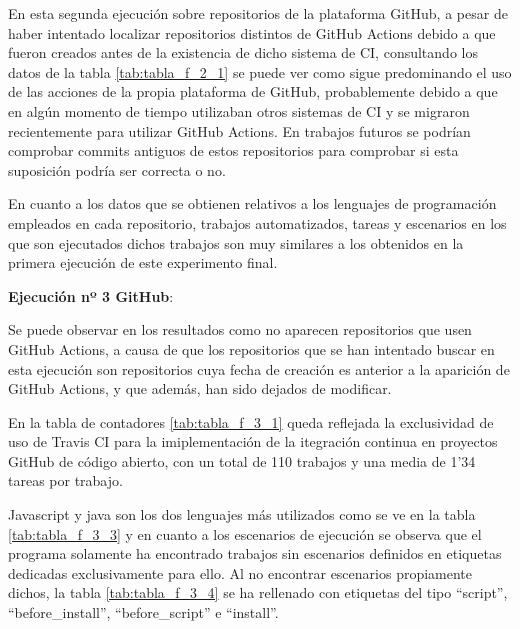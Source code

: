 \begin{compactitem}
    En esta segunda ejecución sobre repositorios de la plataforma GitHub, a pesar de haber intentado localizar repositorios distintos de GitHub Actions debido a que fueron creados antes de la existencia de dicho sistema de CI, consultando los datos de la tabla \ref{tab:tabla_f_2_1} se puede ver como sigue predominando el uso de las acciones de la propia plataforma de GitHub, probablemente debido a que en algún momento de tiempo utilizaban otros sistemas de CI y se migraron recientemente para utilizar GitHub Actions. En trabajos futuros se podrían comprobar commits antiguos de estos repositorios para comprobar si esta suposición podría ser correcta o no.
    
    En cuanto a los datos que se obtienen relativos a los lenguajes de programación empleados en cada repositorio, trabajos automatizados, tareas y escenarios en los que son ejecutados dichos trabajos son muy similares a los obtenidos en la primera ejecución de este experimento final.
    
    \item \textbf{Ejecución nº 3 GitHub}:
    
    Se puede observar en los resultados como no aparecen repositorios que usen GitHub Actions, a causa de que los repositorios que se han intentado buscar en esta ejecución son repositorios cuya fecha de creación es anterior a la aparición de GitHub Actions, y que además, han sido dejados de modificar.

    En la tabla de contadores \ref{tab:tabla_f_3_1} queda reflejada la exclusividad de uso de Travis CI para la imiplementación de la itegración continua en proyectos GitHub de código abierto, con un total de 110 trabajos y una media de 1'34 tareas por trabajo.

    Javascript y java son los dos lenguajes más utilizados como se ve en la tabla \ref{tab:tabla_f_3_3} y en cuanto a los escenarios de ejecución se observa que el programa solamente ha encontrado trabajos sin escenarios definidos en etiquetas dedicadas exclusivamente para ello. Al no encontrar escenarios propiamente dichos, la tabla \ref{tab:tabla_f_3_4} se ha rellenado con etiquetas del tipo ``script'', ``before\_install'', ``before\_script'' e ``install''.
\end{compactitem}